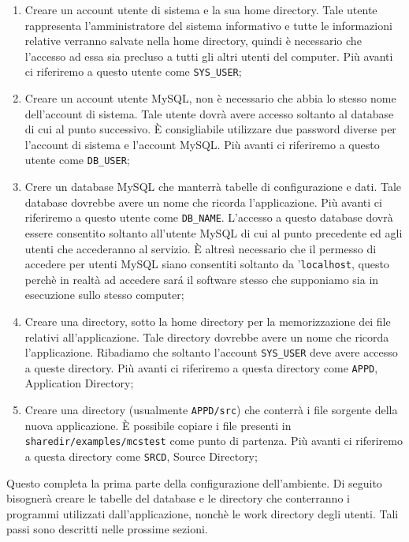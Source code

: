 \begin{enumerate}
\item Creare un account utente di sistema e la sua home
  directory. Tale utente rappresenta l'amministratore del sistema
  informativo e tutte le informazioni relative verranno salvate nella
  home directory, quindi \`e necessario che l'accesso ad essa sia
  precluso a tutti gli altri utenti del computer. Pi\`u avanti ci
  riferiremo a questo utente come \verb|SYS_USER|;
\item Creare un account utente MySQL, non \`e necessario che abbia lo
  stesso nome dell'account di sistema. Tale utente dovr\`a avere
  accesso soltanto al database di cui al punto successivo. \`E
  consigliabile utilizzare due password diverse per l'account di
  sistema e l'account MySQL. Pi\`u avanti ci riferiremo a questo
  utente come \verb|DB_USER|;
\item Crere un database MySQL che manterr\`a tabelle di configurazione
  e dati. Tale database dovrebbe avere un nome che ricorda
  l'applicazione. Pi\`u avanti ci riferiremo a questo utente come
  \verb|DB_NAME|. L'accesso a questo database dovr\`a essere
  consentito soltanto all'utente MySQL di cui al punto precedente ed
  agli utenti che accederanno al servizio. \`E altres\`i necessario
  che il permesso di accedere per utenti MySQL siano consentiti
  soltanto da '\verb|localhost|, questo perch\`e in realt\`a ad
  accedere sar\'a il software \mcs stesso che supponiamo sia in
  esecuzione sullo stesso computer;
\item Creare una directory, sotto la home directory per la
  memorizzazione dei file relativi all'applicazione. Tale directory
  dovrebbe avere un nome che ricorda l'applicazione. Ribadiamo che
  soltanto l'account \verb|SYS_USER| deve avere accesso a queste
  directory. Pi\`u avanti ci riferiremo a questa directory come
  \verb|APPD|, Application Directory;
\item Creare una directory (usualmente \verb|APPD/src|) che conterr\`a
  i file sorgente della nuova applicazione. \`E possibile copiare i
  file presenti in \verb|sharedir/examples/mcstest| come punto di
  partenza. Pi\`u avanti ci riferiremo a questa directory come
  \verb|SRCD|, Source Directory;
\end{enumerate}
%
Questo completa la prima parte della configurazione dell'ambiente. Di
seguito bisogner\`a creare le tabelle del database e le directory che
conterranno i programmi utilizzati dall'applicazione, nonch\`e le work
directory degli utenti. Tali passi sono descritti nelle prossime
sezioni.

